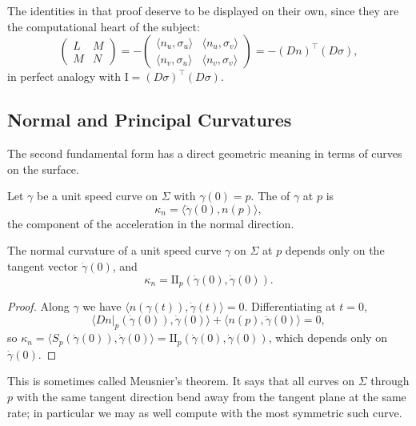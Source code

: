 \documentclass[a4paper]{scrartcl}
\begin{document}
The identities in that proof deserve to be displayed on their own, since they are the computational heart of the subject:
$$
\begin{pmatrix} L & M \\ M & N\end{pmatrix} = -\begin{pmatrix} \langle n_u, \sigma_u\rangle & \langle n_u, \sigma_v\rangle \\ \langle n_v, \sigma_u \rangle & \langle n_v, \sigma_v\rangle\end{pmatrix} = -(Dn)^\top (D\sigma),
$$
in perfect analogy with $\mathrm{I} = (D\sigma)^\top(D\sigma)$.

\subsection{Normal and Principal Curvatures}

The second fundamental form has a direct geometric meaning in terms of curves on the surface.

\begin{definition}
    Let $\gamma$ be a unit speed curve on $\Sigma$ with $\gamma(0) = p$. The  of $\gamma$ at $p$ is
    $$
    \kappa_n = \langle \ddot\gamma(0), n(p)\rangle,
    $$
    the component of the acceleration in the normal direction.
\end{definition}

\begin{proposition}
    The normal curvature of a unit speed curve $\gamma$ on $\Sigma$ at $p$ depends only on the tangent vector $\dot\gamma(0)$, and
    $$
    \kappa_n = \mathrm{II}_p(\dot\gamma(0), \dot\gamma(0)).
    $$
\end{proposition}
\begin{proof}
    Along $\gamma$ we have $\langle n(\gamma(t)), \dot\gamma(t)\rangle = 0$. Differentiating at $t = 0$,
    $$
    \langle \left.Dn\right|_p(\dot\gamma(0)), \dot\gamma(0)\rangle + \langle n(p), \ddot\gamma(0)\rangle = 0,
    $$
    so $\kappa_n = \langle S_p(\dot\gamma(0)), \dot\gamma(0)\rangle = \mathrm{II}_p(\dot\gamma(0), \dot\gamma(0))$, which depends only on $\dot\gamma(0)$.
\end{proof}

This is sometimes called Meusnier's theorem. It says that all curves on $\Sigma$ through $p$ with the same tangent direction bend away from the tangent plane at the same rate; in particular we may as well compute with the most symmetric such curve.
\end{document}
